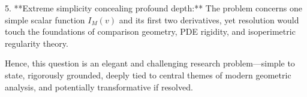 5. **Extreme simplicity concealing profound depth:**  
   The problem concerns one simple scalar function \(I_M(v)\) and its first two derivatives, yet resolution would touch the foundations of comparison geometry, PDE rigidity, and isoperimetric regularity theory.

Hence, this question is an elegant and challenging research problem—simple to state, rigorously grounded, deeply tied to central themes of modern geometric analysis, and potentially transformative if resolved.